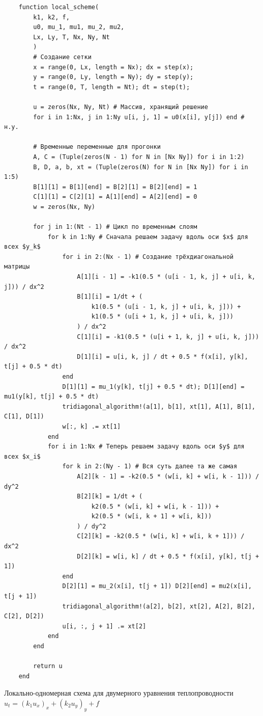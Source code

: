 \begin{listing}
    \begin{verbatim}
    function local_scheme(
        k1, k2, f, 
        u0, mu_1, mu1, mu_2, mu2,
        Lx, Ly, T, Nx, Ny, Nt
        )
        # Создание сетки
        x = range(0, Lx, length = Nx); dx = step(x);
        y = range(0, Ly, length = Ny); dy = step(y);
        t = range(0, T, length = Nt); dt = step(t);

        u = zeros(Nx, Ny, Nt) # Массив, хранящий решение
        for i in 1:Nx, j in 1:Ny u[i, j, 1] = u0(x[i], y[j]) end # н.у.
    
        # Временные переменные для прогонки
        A, C = (Tuple(zeros(N - 1) for N in [Nx Ny]) for i in 1:2)
        B, D, a, b, xt = (Tuple(zeros(N) for N in [Nx Ny]) for i in 1:5)
        B[1][1] = B[1][end] = B[2][1] = B[2][end] = 1
        C[1][1] = C[2][1] = A[1][end] = A[2][end] = 0
        w = zeros(Nx, Ny)
    
        for j in 1:(Nt - 1) # Цикл по временным слоям
            for k in 1:Ny # Сначала решаем задачу вдоль оси $x$ для всех $y_k$
                for i in 2:(Nx - 1) # Создание трёхдиагональной матрицы
                    A[1][i - 1] = -k1(0.5 * (u[i - 1, k, j] + u[i, k, j])) / dx^2
                    B[1][i] = 1/dt + (
                        k1(0.5 * (u[i - 1, k, j] + u[i, k, j])) +
                        k1(0.5 * (u[i + 1, k, j] + u[i, k, j]))
                    ) / dx^2
                    C[1][i] = -k1(0.5 * (u[i + 1, k, j] + u[i, k, j])) / dx^2
                    D[1][i] = u[i, k, j] / dt + 0.5 * f(x[i], y[k], t[j] + 0.5 * dt)
                end
                D[1][1] = mu_1(y[k], t[j] + 0.5 * dt); D[1][end] = mu1(y[k], t[j] + 0.5 * dt)
                tridiagonal_algorithm!(a[1], b[1], xt[1], A[1], B[1], C[1], D[1])
                w[:, k] .= xt[1]
            end
            for i in 1:Nx # Теперь решаем задачу вдоль оси $y$ для всех $x_i$
                for k in 2:(Ny - 1) # Вся суть далее та же самая
                    A[2][k - 1] = -k2(0.5 * (w[i, k] + w[i, k - 1])) / dy^2
                    B[2][k] = 1/dt + (
                        k2(0.5 * (w[i, k] + w[i, k - 1])) +
                        k2(0.5 * (w[i, k + 1] + w[i, k]))
                    ) / dy^2
                    C[2][k] = -k2(0.5 * (w[i, k] + w[i, k + 1])) / dx^2
                    D[2][k] = w[i, k] / dt + 0.5 * f(x[i], y[k], t[j + 1])
                end
                D[2][1] = mu_2(x[i], t[j + 1]) D[2][end] = mu2(x[i], t[j + 1])
                tridiagonal_algorithm!(a[2], b[2], xt[2], A[2], B[2], C[2], D[2])
                u[i, :, j + 1] .= xt[2]
            end
        end
    
        return u
    end
    \end{verbatim}
    \caption{Локально-одномерная схема для двумерного уравнения теплопроводности $u_t = (k_1u_x)_x + (k_2 u_y)_y + f$}
    \label{listing:loc_scheme}
\end{listing}
